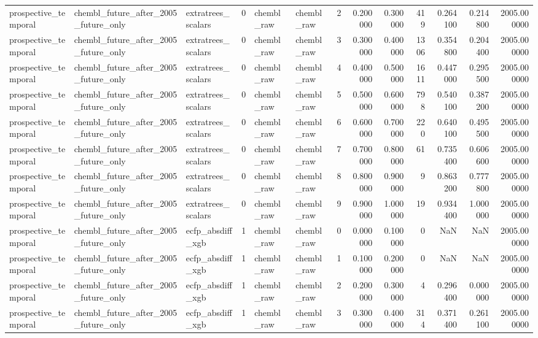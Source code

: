 \begin{longtable}{lllrllrrrrrrr}
prospective\_temporal & chembl\_future\_after\_2005\_future\_only & extratrees\_scalars & 0 & chembl\_raw & chembl\_raw & 2 & 0.200000 & 0.300000 & 419 & 0.264100 & 0.214800 & 2005.000000 \\
prospective\_temporal & chembl\_future\_after\_2005\_future\_only & extratrees\_scalars & 0 & chembl\_raw & chembl\_raw & 3 & 0.300000 & 0.400000 & 1306 & 0.354800 & 0.204400 & 2005.000000 \\
prospective\_temporal & chembl\_future\_after\_2005\_future\_only & extratrees\_scalars & 0 & chembl\_raw & chembl\_raw & 4 & 0.400000 & 0.500000 & 1611 & 0.447000 & 0.295500 & 2005.000000 \\
prospective\_temporal & chembl\_future\_after\_2005\_future\_only & extratrees\_scalars & 0 & chembl\_raw & chembl\_raw & 5 & 0.500000 & 0.600000 & 798 & 0.540100 & 0.387200 & 2005.000000 \\
prospective\_temporal & chembl\_future\_after\_2005\_future\_only & extratrees\_scalars & 0 & chembl\_raw & chembl\_raw & 6 & 0.600000 & 0.700000 & 220 & 0.640100 & 0.495500 & 2005.000000 \\
prospective\_temporal & chembl\_future\_after\_2005\_future\_only & extratrees\_scalars & 0 & chembl\_raw & chembl\_raw & 7 & 0.700000 & 0.800000 & 61 & 0.735400 & 0.606600 & 2005.000000 \\
prospective\_temporal & chembl\_future\_after\_2005\_future\_only & extratrees\_scalars & 0 & chembl\_raw & chembl\_raw & 8 & 0.800000 & 0.900000 & 9 & 0.863200 & 0.777800 & 2005.000000 \\
prospective\_temporal & chembl\_future\_after\_2005\_future\_only & extratrees\_scalars & 0 & chembl\_raw & chembl\_raw & 9 & 0.900000 & 1.000000 & 19 & 0.934400 & 1.000000 & 2005.000000 \\
prospective\_temporal & chembl\_future\_after\_2005\_future\_only & ecfp\_absdiff\_xgb & 1 & chembl\_raw & chembl\_raw & 0 & 0.000000 & 0.100000 & 0 & NaN & NaN & 2005.000000 \\
prospective\_temporal & chembl\_future\_after\_2005\_future\_only & ecfp\_absdiff\_xgb & 1 & chembl\_raw & chembl\_raw & 1 & 0.100000 & 0.200000 & 0 & NaN & NaN & 2005.000000 \\
prospective\_temporal & chembl\_future\_after\_2005\_future\_only & ecfp\_absdiff\_xgb & 1 & chembl\_raw & chembl\_raw & 2 & 0.200000 & 0.300000 & 4 & 0.296400 & 0.000000 & 2005.000000 \\
prospective\_temporal & chembl\_future\_after\_2005\_future\_only & ecfp\_absdiff\_xgb & 1 & chembl\_raw & chembl\_raw & 3 & 0.300000 & 0.400000 & 314 & 0.371400 & 0.261100 & 2005.000000 \\

\end{longtable}
